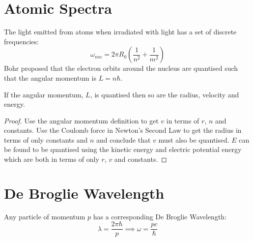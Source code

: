 \documentclass[../Main.tex]{subfiles}
\begin{document}
\section{Atomic Spectra}
The light emitted from atoms when irradiated with light has a set of discrete frequencies:
\begin{equation*}
    \omega_{mn} = 2\pi R_0 \left(\frac{1}{n^2} + \frac{1}{m^2}\right)
\end{equation*}
Bohr proposed that the electron orbits around the nucleus are quantised such that the angular momentum is $L = n\hbar$.
\begin{theorem}
    If the angular momentum, $L$, is quantised then so are the radius, velocity and energy.
    \label{thmQuantisationConsequences}
\end{theorem}
\begin{proof}
    Use the angular momentum definition to get $v$ in terms of $r$, $n$ and constants. Use the Coulomb force in Newton's Second Law to get the radius in terms of only constants and $n$ and conclude that $v$ must also be quantised. $E$ can be found to be quantised using the kinetic energy and electric potential energy which are both in terms of only $r$, $v$ and constants.
\end{proof}
\section{De Broglie Wavelength}
Any particle of momentum $p$ has a corresponding De Broglie Wavelength:
\begin{equation*}
    \lambda = \frac{2\pi \hbar}{p} \implies \omega = \frac{pc}{\hbar}
\end{equation*}
\end{document}
